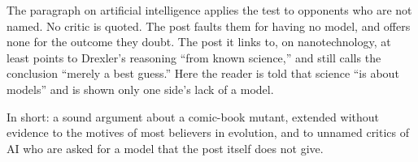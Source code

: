 \begin{afterword}
The paragraph on artificial intelligence applies the test to opponents who are not named. No critic is quoted. The post faults them for having no model, and offers none for the outcome they doubt. The post it links to, on nanotechnology, at least points to Drexler's reasoning ``from known science,'' and still calls the conclusion ``merely a best guess.'' Here the reader is told that science ``is about models'' and is shown only one side's lack of a model.

In short: a sound argument about a comic-book mutant, extended without evidence to the motives of most believers in evolution, and to unnamed critics of AI who are asked for a model that the post itself does not give.
\end{afterword}
